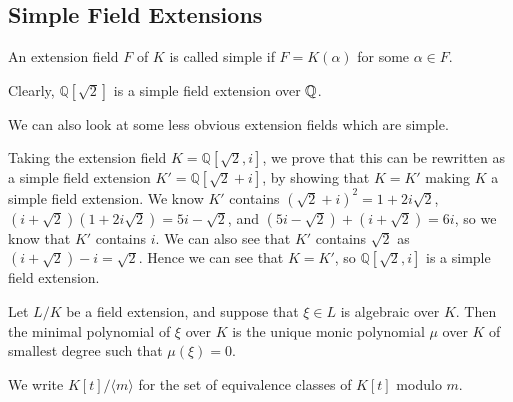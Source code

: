 \subsection{Simple Field Extensions}
\begin{definition}
An extension field \(F\) of \(K\) is called simple if \(F = K(\alpha)\) for some \(\alpha \in F\).
\end{definition}
\begin{example}
Clearly, \(\mathbb{Q}[\sqrt{2}]\) is a simple field extension over \(\mathbb Q\).
\end{example}
We can also look at some less obvious extension fields which are simple.
\begin{example}
Taking the extension field \(K = \mathbb{Q}[\sqrt{2}, i]\), we prove that this can be rewritten as a simple field extension \(K' = \mathbb{Q}[\sqrt{2} + i]\), by showing that \(K=K'\) making \(K\) a simple field extension. We know \(K'\) contains
$(\sqrt{2} + i)^2 = 1 + 2i\sqrt{2}$, $(i + \sqrt{2})(1+2i\sqrt{2}) = 5i - \sqrt{2}$, and 
$(5i - \sqrt{2}) + (i + \sqrt{2}) = 6i$, 
so we know that \(K'\) contains \(i\). We can also see that \(K'\) contains \(\sqrt{2}\) as \((i+\sqrt{2})-i = \sqrt{2}\). Hence we can see that \(K = K'\), so \(\mathbb{Q}[\sqrt{2},i]\) is a simple field extension.
\end{example}


\begin{definition}
    Let $L / K$ be a field extension, and suppose that $\xi \in L$ is algebraic over $K$. Then the minimal polynomial of $\xi$ over $K$ is the unique monic polynomial $\mu$ over $K$ of smallest degree such that $\mu(\xi)=0$.


We write
$
K[t] /\langle m\rangle
$
for the set of equivalence classes of $K[t]$ modulo $m$. 
\end{definition}


